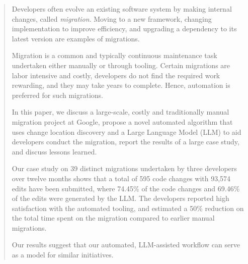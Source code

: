 
\begin{abstract}
Developers often evolve an existing software system by making
internal changes, called \emph{migration}. Moving to a new framework,
changing implementation to improve efficiency, and upgrading a
dependency to its latest version are examples of migrations.

Migration is a common and typically continuous maintenance
task undertaken either manually or through tooling. Certain 
migrations are labor intensive and costly, developers do not find the
required work rewarding, and they may take years to complete.
Hence, automation is preferred for such migrations.

In this paper, we discuss a large-scale, costly and traditionally
manual migration project at Google, propose a novel automated
algorithm that uses change location discovery and a Large Language
Model (LLM) to aid developers conduct the migration, report the
results of a large case study, and discuss lessons learned.

Our case study on 39 distinct migrations undertaken by three developers 
over twelve months shows that a total of 595 code changes
with 93,574 edits have been submitted, where 74.45\% of the code
changes and 69.46\% of the edits were generated by the LLM. The 
developers reported high satisfaction with the automated tooling, and
estimated a 50\% reduction on the total time spent on the migration
compared to earlier manual migrations.

Our results suggest that our automated, LLM-assisted workflow
can serve as a model for similar initiatives.
\end{abstract}

